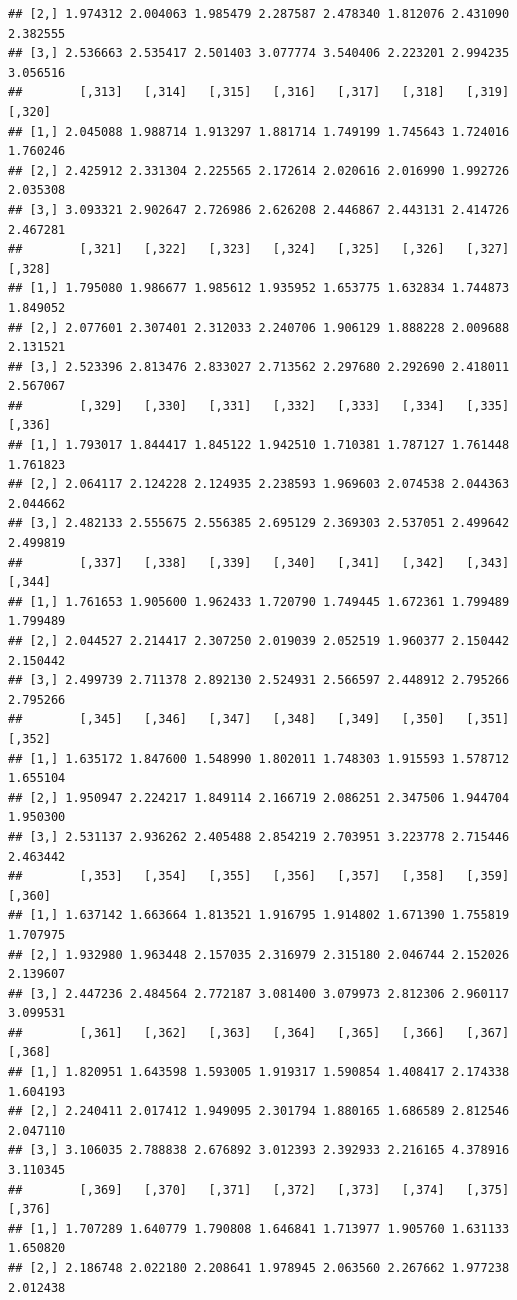 \documentclass[article]{jss}\usepackage[]{graphicx}\usepackage[]{xcolor}
\makeatletter
\newenvironment{kframe}{%
 \def\at@end@of@kframe{}%
 \ifinner\ifhmode%
  \def\at@end@of@kframe{\end{minipage}}%
  \begin{minipage}{\columnwidth}%
 \fi\fi%
 \def\FrameCommand##1{\hskip\@totalleftmargin \hskip-\fboxsep
 \colorbox{shadecolor}{##1}\hskip-\fboxsep
     \hskip-\linewidth \hskip-\@totalleftmargin \hskip\columnwidth}%
 \MakeFramed {\advance\hsize-\width
   \@totalleftmargin\z@ \linewidth\hsize
   \@setminipage}}%
 {\par\unskip\endMakeFramed%
 \at@end@of@kframe}
\newenvironment{knitrout}{}{} %
\makeatother
\begin{document}
\begin{knitrout}
\begin{kframe}
\begin{verbatim}
## [2,] 1.974312 2.004063 1.985479 2.287587 2.478340 1.812076 2.431090 2.382555
## [3,] 2.536663 2.535417 2.501403 3.077774 3.540406 2.223201 2.994235 3.056516
##        [,313]   [,314]   [,315]   [,316]   [,317]   [,318]   [,319]   [,320]
## [1,] 2.045088 1.988714 1.913297 1.881714 1.749199 1.745643 1.724016 1.760246
## [2,] 2.425912 2.331304 2.225565 2.172614 2.020616 2.016990 1.992726 2.035308
## [3,] 3.093321 2.902647 2.726986 2.626208 2.446867 2.443131 2.414726 2.467281
##        [,321]   [,322]   [,323]   [,324]   [,325]   [,326]   [,327]   [,328]
## [1,] 1.795080 1.986677 1.985612 1.935952 1.653775 1.632834 1.744873 1.849052
## [2,] 2.077601 2.307401 2.312033 2.240706 1.906129 1.888228 2.009688 2.131521
## [3,] 2.523396 2.813476 2.833027 2.713562 2.297680 2.292690 2.418011 2.567067
##        [,329]   [,330]   [,331]   [,332]   [,333]   [,334]   [,335]   [,336]
## [1,] 1.793017 1.844417 1.845122 1.942510 1.710381 1.787127 1.761448 1.761823
## [2,] 2.064117 2.124228 2.124935 2.238593 1.969603 2.074538 2.044363 2.044662
## [3,] 2.482133 2.555675 2.556385 2.695129 2.369303 2.537051 2.499642 2.499819
##        [,337]   [,338]   [,339]   [,340]   [,341]   [,342]   [,343]   [,344]
## [1,] 1.761653 1.905600 1.962433 1.720790 1.749445 1.672361 1.799489 1.799489
## [2,] 2.044527 2.214417 2.307250 2.019039 2.052519 1.960377 2.150442 2.150442
## [3,] 2.499739 2.711378 2.892130 2.524931 2.566597 2.448912 2.795266 2.795266
##        [,345]   [,346]   [,347]   [,348]   [,349]   [,350]   [,351]   [,352]
## [1,] 1.635172 1.847600 1.548990 1.802011 1.748303 1.915593 1.578712 1.655104
## [2,] 1.950947 2.224217 1.849114 2.166719 2.086251 2.347506 1.944704 1.950300
## [3,] 2.531137 2.936262 2.405488 2.854219 2.703951 3.223778 2.715446 2.463442
##        [,353]   [,354]   [,355]   [,356]   [,357]   [,358]   [,359]   [,360]
## [1,] 1.637142 1.663664 1.813521 1.916795 1.914802 1.671390 1.755819 1.707975
## [2,] 1.932980 1.963448 2.157035 2.316979 2.315180 2.046744 2.152026 2.139607
## [3,] 2.447236 2.484564 2.772187 3.081400 3.079973 2.812306 2.960117 3.099531
##        [,361]   [,362]   [,363]   [,364]   [,365]   [,366]   [,367]   [,368]
## [1,] 1.820951 1.643598 1.593005 1.919317 1.590854 1.408417 2.174338 1.604193
## [2,] 2.240411 2.017412 1.949095 2.301794 1.880165 1.686589 2.812546 2.047110
## [3,] 3.106035 2.788838 2.676892 3.012393 2.392933 2.216165 4.378916 3.110345
##        [,369]   [,370]   [,371]   [,372]   [,373]   [,374]   [,375]   [,376]
## [1,] 1.707289 1.640779 1.790808 1.646841 1.713977 1.905760 1.631133 1.650820
## [2,] 2.186748 2.022180 2.208641 1.978945 2.063560 2.267662 1.977238 2.012438

\end{verbatim}
\end{kframe}
\end{knitrout}
\end{document}
